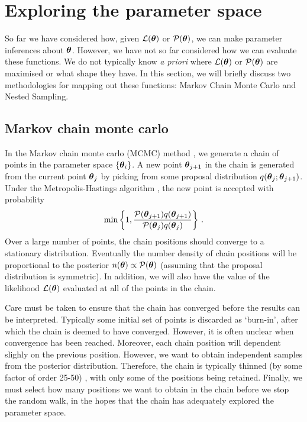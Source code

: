 \section{Exploring the parameter space}

So far we have considered how, given $\mathcal{L}(\boldsymbol\theta)$ or $\mathcal{P}(\boldsymbol\theta)$, we can make parameter inferences about $\boldsymbol\theta$. However, we have not so far considered how we can evaluate these functions. We do not typically know \textit{a priori} where $\mathcal{L}(\boldsymbol\theta)$ or $\mathcal{P}(\boldsymbol\theta)$ are maximised or what shape they have. In this section, we will briefly discuss two methodologies for mapping out these functions: Markov Chain Monte Carlo and Nested Sampling.

\subsection{Markov chain monte carlo}


In the Markov chain monte carlo (MCMC) method \cite{Lewis:2009}, we generate a chain of points in the parameter space $\left\{\boldsymbol\theta_i\right\}$. A new point $\boldsymbol\theta_{j+1}$ in the chain is generated from the current point $\boldsymbol\theta_{j}$ by picking from some proposal distribution $q(\boldsymbol\theta_{j}; \boldsymbol\theta_{j+1})$. Under the Metropolis-Hastings algorithm \cite{Metropolis:1953}, the new point is accepted with probability
\begin{equation}
\textrm{min}\left\{1, \frac{\mathcal{P}(\boldsymbol\theta_{j+1})q(\boldsymbol\theta_{j+1})}{\mathcal{P}(\boldsymbol\theta_{j})q(\boldsymbol\theta_{j})} \right\}\,.
\end{equation}
Over a large number of points, the chain positions should converge to a stationary distribution. Eventually the number density of chain positions will be proportional to the posterior \(n(\boldsymbol\theta) \propto \mathcal{P}(\boldsymbol\theta)\) (assuming that the proposal distribution is symmetric). In addition, we will also have the value of the likelihood $\mathcal{L}(\boldsymbol\theta)$ evaluated at all of the points in the chain.

Care must be taken to ensure that the chain has converged before the results can be interpreted. Typically some initial set of points is discarded as `burn-in', after which the chain is deemed to have converged. However, it is often unclear when convergence has been reached. Moreover, each chain position will dependent slighly on the previous position. However, we want to obtain independent samples from the posterior distribution. Therefore, the chain is typically thinned (by some factor of order 25-50) \cite{Lewis:2002}, with only some of the positions being retained. Finally, we must select how many positions we want to obtain in the chain before we stop the random walk, in the hopes that the chain has adequately explored the parameter space.

